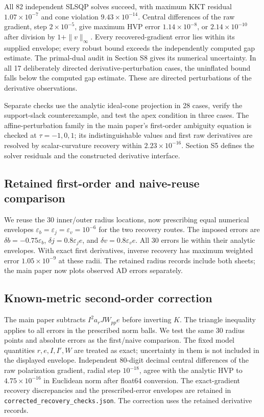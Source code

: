 \documentclass[10pt,a4paper]{article}
\begin{document}
All 82 independent SLSQP solves succeed, with maximum KKT residual $1.07\times10^{-7}$ and cone violation $9.43\times10^{-14}$. Central differences of the raw gradient, step $2\times10^{-5}$, give maximum HVP error $1.14\times10^{-8}$, or $2.14\times10^{-10}$ after division by $1+\|v\|_\infty$. Every recovered-gradient error lies within its supplied envelope; every robust bound exceeds the independently computed gap estimate. The primal-dual audit in Section S8 gives its numerical uncertainty. In all 17 deliberately directed derivative-perturbation cases, the uninflated bound falls below the computed gap estimate. These are directed perturbations of the derivative observations.

Separate checks use the analytic ideal-cone projection in 28 cases, verify the support-slack counterexample, and test the apex condition in three cases. The affine-perturbation family in the main paper's first-order ambiguity equation is checked at $\tau=-1,0,1$; its indistinguishable values and first raw derivatives are resolved by scalar-curvature recovery within $2.23\times10^{-16}$. Section S5 defines the solver residuals and the constructed derivative interface.



\subsection{Retained first-order and naive-reuse comparison}
We reuse the 30 inner/outer radius locations, now prescribing equal numerical envelopes $\varepsilon_b=\varepsilon_j=\varepsilon_v=10^{-6}$ for the two recovery routes. The imposed errors are $\delta b=-0.75\varepsilon_b$, $\delta j=0.8\varepsilon_je$, and $\delta v=0.8\varepsilon_ve$. All 30 errors lie within their analytic envelopes. With exact first derivatives, inverse recovery has maximum weighted error $1.05\times10^{-9}$ at these radii. The retained radius records include both sheets; the main paper now plots observed AD errors separately.



\subsection{Known-metric second-order correction}
The main paper subtracts $I^2a_rJW_{pp}e$ before inverting $K$. The triangle inequality applies to all errors in the prescribed norm balls. We test the same 30 radius points and absolute errors as the first/naive comparison. The fixed model quantities $r,e,I,I',W$ are treated as exact; uncertainty in them is not included in the displayed envelope. Independent 80-digit decimal central differences of the raw polarization gradient, radial step $10^{-18}$, agree with the analytic HVP to $4.75\times10^{-16}$ in Euclidean norm after float64 conversion. The exact-gradient recovery discrepancies and the prescribed-error envelopes are retained in \nolinkurl{corrected_recovery_checks.json}. The correction uses the retained derivative records.
\end{document}
